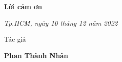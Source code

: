 \vspace*{1cm}
{\Large\textbf{Lời cảm ơn}}

%
%
%
%
%

\begin{flushright}
{\it Tp.HCM, ngày 10 tháng 12 năm 2022}

Tác giả\hskip 2cm \quad \quad

\vskip 2cm

{\bf Phan Thành Nhân} \hskip 1cm \quad\ 
 \end{flushright}
\thispagestyle{empty}
